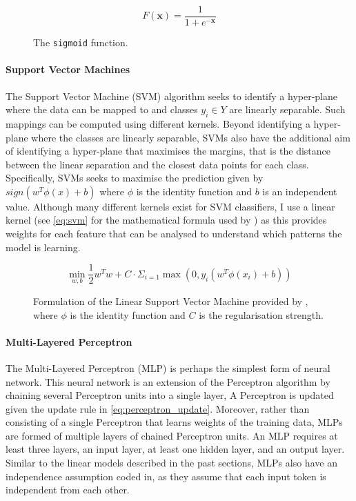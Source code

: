 \begin{figure}[h]
  \begin{equation}\label{eq:sigmoid}
    F(\mathbf{x}) = \frac{1}{1+e^{-\mathbf{x}}}
  \end{equation}
  \caption{The \texttt{sigmoid} function.}
\end{figure}

\paragraph{Support Vector Machines}
The Support Vector Machine (SVM) algorithm seeks to identify a hyper-plane where the data can be mapped to and classes $y_i \in Y$ are linearly separable. 
Such mappings can be computed using different kernels. 
Beyond identifying a hyper-plane where the classes are linearly separable, SVMs also have the additional aim of identifying a hyper-plane that maximises the margins, that is the distance between the linear separation and the closest data points for each class. 
Specifically, SVMs seeks to maximise the prediction given by $sign(w^T\phi(x)+b)$ where $\phi$ is the identity function and $b$ is an independent value.
Although many different kernels exist for SVM classifiers, I use a linear kernel (see \cref{eq:svm} for the mathematical formula used by \citet{Pedregosa:2011}) as this provides weights for each feature that can be analysed to understand which patterns the model is learning.


\begin{figure}[h]
  \begin{equation}\label{eq:svm}
    \min_{w,b} \frac{1}{2}w^T w + C\cdot \Sigma_{i=1}\max(0, y_i(w^T\phi(x_i)+b))
  \end{equation}
  \caption{Formulation of the Linear Support Vector Machine provided by \citet{Pedregosa:2011}, where $\phi$ is the identity function and $C$ is the regularisation strength.}
\end{figure}

\paragraph{Multi-Layered Perceptron}
The Multi-Layered Perceptron (MLP) is perhaps the simplest form of neural network. 
This neural network is an extension of the Perceptron algorithm by chaining several Perceptron units into a single layer, A Perceptron is updated given the update rule in \autoref{eq:perceptron_update}. 
Moreover, rather than consisting of a single Perceptron that learns weights of the training data, MLPs are formed of multiple layers of chained Perceptron units. 
An MLP requires at least three layers, an input layer, at least one hidden layer, and an output layer.
Similar to the linear models described in the past sections, MLPs also have an independence assumption coded in, as they assume that each input token is independent from each other.

